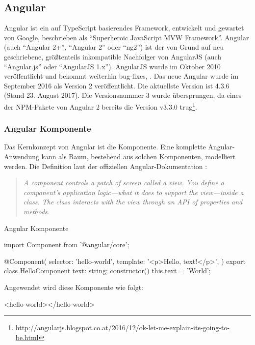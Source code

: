 \subsection{Angular}
\label{sec:angular}
Angular ist ein auf TypeScript basierendes Framework, entwickelt und gewartet von Google, beschrieben als "`Superheroic JavaScript MVW Framework"'. Angular (auch "`Angular 2+"', "`Angular 2"' oder "`ng2"') ist der von Grund auf neu geschriebene, größtenteils inkompatible Nachfolger von AngularJS (auch "`Angular.js"' oder "`AngularJS 1.x"').
AngularJS wurde im Oktober 2010 veröffentlicht und bekommt weiterhin bug-fixes, \etc. Das neue Angular wurde im September 2016 als Version 2 veröffentlicht. Die aktuellste Version ist 4.3.6 (Stand 23. August 2017). Die Versionsnummer 3 wurde übersprungen, da eines der NPM-Pakete von Angular 2 bereits die Version v3.3.0 trug\footnote{\url{http://angularjs.blogspot.co.at/2016/12/ok-let-me-explain-its-going-to-be.html}}.

\subsubsection{Angular Komponente}
Das Kernkonzept von Angular ist die Komponente. Eine komplette Angular-Anwendung kann als Baum, bestehend aus solchen Komponenten, modelliert werden.
Die Definition laut der offiziellen Angular-Dokumentation \cite{angular-component}: 
\begin{quote}
	\begin{english}
		\textit{A component controls a patch of screen called a view. You define a component's application logic—what it does to support the view—inside a class. The class interacts with the view through an API of properties and methods.}
	\end{english}
\end{quote}

\begin{program}[!htbp]
\caption{Angular Komponente}
\begin{JsCode}
	import { Component } from '@angular/core';
	
	@Component({
		selector: 'hello-world',
		template: '<p>Hello, {{text}}!</p>',
	})
	export class HelloComponent {
		text: string;
		constructor() {
			this.text = 'World';
		}
	}
\end{JsCode}
\end{program}
Angewendet wird diese Komponente wie folgt:
\begin{JsCode}[numbers=none]
<hello-world></hello-world>
\end{JsCode}

